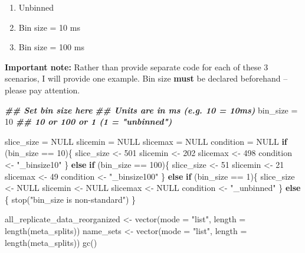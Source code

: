 \documentclass[
]{book}
\newenvironment{Shaded}{\begin{snugshade}}{\end{snugshade}}
\newcommand{\AttributeTok}[1]{\textcolor[rgb]{0.77,0.63,0.00}{#1}}
\newcommand{\ConstantTok}[1]{\textcolor[rgb]{0.00,0.00,0.00}{#1}}
\newcommand{\ControlFlowTok}[1]{\textcolor[rgb]{0.13,0.29,0.53}{\textbf{#1}}}
\newcommand{\DecValTok}[1]{\textcolor[rgb]{0.00,0.00,0.81}{#1}}
\newcommand{\DocumentationTok}[1]{\textcolor[rgb]{0.56,0.35,0.01}{\textbf{\textit{#1}}}}
\newcommand{\FunctionTok}[1]{\textcolor[rgb]{0.00,0.00,0.00}{#1}}
\newcommand{\NormalTok}[1]{#1}
\newcommand{\OtherTok}[1]{\textcolor[rgb]{0.56,0.35,0.01}{#1}}
\newcommand{\SpecialCharTok}[1]{\textcolor[rgb]{0.00,0.00,0.00}{#1}}
\newcommand{\StringTok}[1]{\textcolor[rgb]{0.31,0.60,0.02}{#1}}
\providecommand{\tightlist}{%
  \setlength{\itemsep}{0pt}\setlength{\parskip}{0pt}}
\begin{document}
\begin{enumerate}
\def\labelenumi{\arabic{enumi}.}
\tightlist
\item
  Unbinned
\item
  Bin size = 10 ms
\item
  Bin size = 100 ms
\end{enumerate}

\textbf{Important note:} Rather than provide separate code for each of
these 3 scenarios, I will provide one example. Bin size \textbf{must} be
declared beforehand -- please pay attention.

\begin{Shaded}
\begin{Highlighting}[]
\DocumentationTok{\#\# Set bin size here}
\DocumentationTok{\#\# Units are in ms (e.g. 10 = 10ms)}
\NormalTok{bin\_size }\OtherTok{=} \DecValTok{10} \DocumentationTok{\#\# 10 or 100 or 1 (1 = "unbinned")}

\NormalTok{slice\_size }\OtherTok{=} \ConstantTok{NULL}
\NormalTok{slicemin }\OtherTok{=} \ConstantTok{NULL}
\NormalTok{slicemax }\OtherTok{=} \ConstantTok{NULL}
\NormalTok{condition }\OtherTok{=} \ConstantTok{NULL}
\ControlFlowTok{if}\NormalTok{ (bin\_size }\SpecialCharTok{==} \DecValTok{10}\NormalTok{)\{}
\NormalTok{  slice\_size }\OtherTok{\textless{}{-}} \DecValTok{501}
\NormalTok{  slicemin }\OtherTok{\textless{}{-}} \DecValTok{202}
\NormalTok{  slicemax }\OtherTok{\textless{}{-}} \DecValTok{498}
\NormalTok{  condition }\OtherTok{\textless{}{-}} \StringTok{"\_binsize10"}
\NormalTok{\} }\ControlFlowTok{else} \ControlFlowTok{if}\NormalTok{ (bin\_size }\SpecialCharTok{==} \DecValTok{100}\NormalTok{)\{}
\NormalTok{  slice\_size }\OtherTok{\textless{}{-}} \DecValTok{51}
\NormalTok{  slicemin }\OtherTok{\textless{}{-}} \DecValTok{21}
\NormalTok{  slicemax }\OtherTok{\textless{}{-}} \DecValTok{49}
\NormalTok{  condition }\OtherTok{\textless{}{-}} \StringTok{"\_binsize100"}
\NormalTok{\} }\ControlFlowTok{else} \ControlFlowTok{if}\NormalTok{ (bin\_size }\SpecialCharTok{==} \DecValTok{1}\NormalTok{)\{}
\NormalTok{  slice\_size }\OtherTok{\textless{}{-}} \ConstantTok{NULL}
\NormalTok{  slicemin }\OtherTok{\textless{}{-}} \ConstantTok{NULL}
\NormalTok{  slicemax }\OtherTok{\textless{}{-}} \ConstantTok{NULL}
\NormalTok{  condition }\OtherTok{\textless{}{-}} \StringTok{"\_unbinned"}
\NormalTok{\} }\ControlFlowTok{else}\NormalTok{ \{}
  \FunctionTok{stop}\NormalTok{(}\StringTok{"bin\_size is non{-}standard"}\NormalTok{)}
\NormalTok{\}}


\NormalTok{all\_replicate\_data\_reorganized }\OtherTok{\textless{}{-}}
  \FunctionTok{vector}\NormalTok{(}\AttributeTok{mode =} \StringTok{"list"}\NormalTok{, }\AttributeTok{length =} \FunctionTok{length}\NormalTok{(meta\_splits))}
\NormalTok{name\_sets }\OtherTok{\textless{}{-}}
  \FunctionTok{vector}\NormalTok{(}\AttributeTok{mode =} \StringTok{"list"}\NormalTok{, }\AttributeTok{length =} \FunctionTok{length}\NormalTok{(meta\_splits))}
\FunctionTok{gc}\NormalTok{()}
\end{Highlighting}
\end{Shaded}
\end{document}
